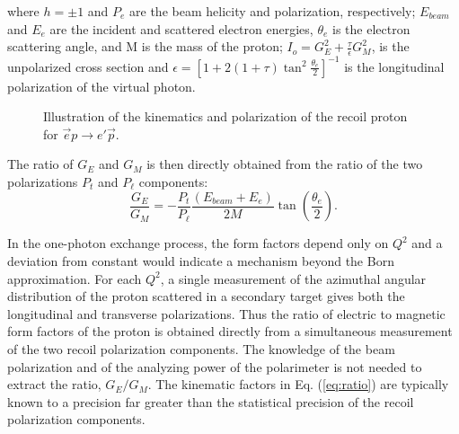 \noindent
where $h = \pm 1$ and $P_e$ are the beam helicity and polarization, respectively; $E_{beam}$ and $E_{e}$ are the incident and scattered 
electron energies, $\theta_{e}$ is the electron scattering angle, and M is the 
mass of the proton; $I_o=G_E^2+\frac{\tau}{\epsilon}G_M^2$, is the unpolarized cross section and 
$\epsilon=[1+2(1+\tau)\tan^2\frac{\theta_{e}}{2}]^{-1}$ is the longitudinal polarization of the virtual photon.


\begin{figure}
\begin{center}
\caption{Illustration of the kinematics and polarization of the recoil proton for $\vec e p\rightarrow e' \vec p$.}
\label{fig:nlt}
\end{center}
\end{figure}

The ratio of $G_E$ and $G_M$ is then directly obtained from the ratio of the two polarizations $P_t$ and $P_{\ell}$
components:
\begin{equation}
\frac{G_{E}}{G_{M}}=-\frac{P_{t}}{P_{\ell}}\frac{(E_{beam}+E_{e})} 
{2M}\tan (\frac{\theta_{e}}{2}).
\label{eq:ratio}
\end{equation}

In the one-photon exchange process, the form factors depend only on $Q^2$ and a deviation from constant would 
indicate a mechanism beyond the Born approximation. For each $Q^2$, a single measurement of the azimuthal angular
distribution of the proton scattered in a secondary target gives both the longitudinal and transverse polarizations.
Thus the ratio of electric to magnetic form factors of the proton is obtained directly from a simultaneous 
measurement of the two recoil polarization components. The knowledge of the beam polarization and of the analyzing power of the 
polarimeter is not needed to extract the ratio, $G_{E}/G_{M}$.  The kinematic factors in Eq. (\ref{eq:ratio}) are
typically known to a precision far greater than the statistical precision of the recoil polarization components.



